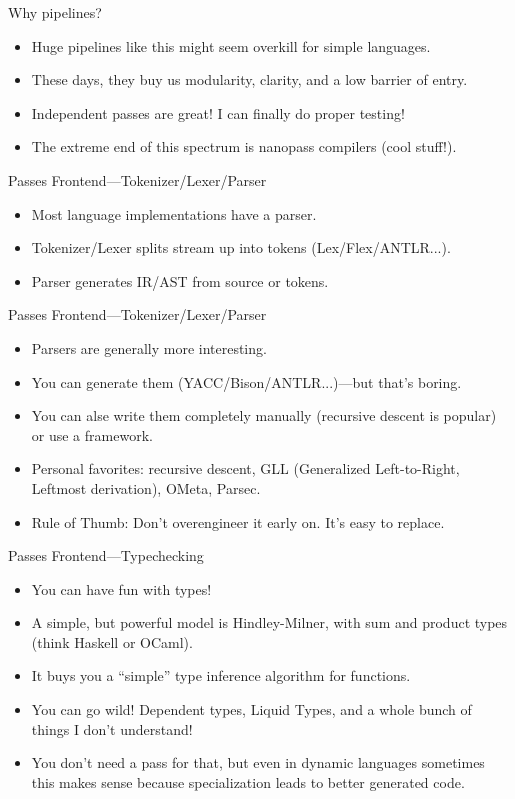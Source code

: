 \documentclass[aspectratio=169]{beamer}
\begin{document}
  \begin{frame}{Why pipelines?}
    \begin{itemize}
      \item Huge pipelines like this might seem overkill for simple languages.
      \item These days, they buy us modularity, clarity, and a low barrier of entry.
      \item Independent passes are great! I can finally do proper testing!
      \item The extreme end of this spectrum is nanopass compilers (cool stuff!).
    \end{itemize}
  \end{frame}
  \begin{frame}{Passes Frontend—Tokenizer/Lexer/Parser}
    \begin{itemize}
      \item Most language implementations have a parser.
      \item Tokenizer/Lexer splits stream up into tokens (Lex/Flex/ANTLR...).
      \item Parser generates IR/AST from source or tokens.
    \end{itemize}
  \end{frame}
  \begin{frame}{Passes Frontend—Tokenizer/Lexer/Parser}
    \begin{itemize}
      \item Parsers are generally more interesting.
      \item You can generate them (YACC/Bison/ANTLR...)—but that’s boring.
      \item You can alse write them completely manually (recursive descent is
            popular) or use a framework.
      \item Personal favorites: recursive descent, GLL (Generalized
            Left-to-Right, Leftmost derivation), OMeta, Parsec.
      \item Rule of Thumb: Don’t overengineer it early on. It’s easy to replace.
    \end{itemize}
  \end{frame}
  \begin{frame}{Passes Frontend—Typechecking}
    \begin{itemize}
      \item You can have fun with types!
      \item A simple, but powerful model is Hindley-Milner, with sum and product
            types (think Haskell or OCaml).
      \item It buys you a “simple” type inference algorithm for functions.
      \item You can go wild! Dependent types, Liquid Types, and a whole bunch of
            things I don’t understand!
      \item You don’t need a pass for that, but even in dynamic languages
            sometimes this makes sense because specialization leads to better
            generated code.
    \end{itemize}
  \end{frame}
\end{document}
